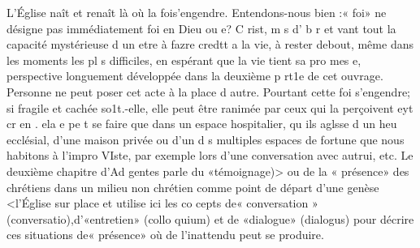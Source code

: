 L'Église naît et renaît là où la fois'engendre. Entendons-nous bien :« foi»  ne désigne pas immédiatement foi en Dieu ou
e? C rist, m s d' b r et vant tout la capacité mystérieuse d un etre à fazre credtt a la vie, à rester debout, même dans les moments les pl s difficiles, en espérant que la vie tient sa pro­ mes e, perspective longuement développée dans la deuxième
p rt1e de cet ouvrage. Personne ne peut poser cet acte à la place d	autre. Pourtant cette foi s'engendre; si fragile et cachée so1t.-elle, elle peut être ranimée par ceux qui la perçoivent eyt cr en . ela e pe t se faire que dans un espace hospitalier, qu ils aglsse d un heu ecclésial, d'une maison privée ou d'un
d s multiples espaces de fortune que nous habitons à l'impro­ VIste, par exemple lors d'une conversation avec autrui, etc. Le deuxième chapitre d'Ad gentes parle du «témoignage)> ou de la
« présence» des chrétiens dans un milieu non chrétien comme point de départ d'une genèse <l'Église sur place et utilise ici les co cepts de« conversation » (conversatio),d'«entretien» (collo­ quium) et de «dialogue» (dialogus) pour décrire ces situations de« présence» où de l'inattendu peut se produire.
